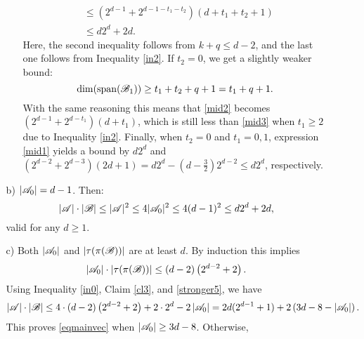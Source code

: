 \begin{enumerate}
\begin{enumerate}
\begin{enumerate}
\begin{align}
                    & \leq \left(2^{d-1} + 2^{d-1-t_1-t_2}\right)\left(d+t_1+t_2+1\right) \nonumber \\
                    & \leq d2^d + 2d. \label{mid3}             
                \end{align}
          Here, the second inequality follows from $k+q\leq d-2$, and the last one follows from Inequality \ref{in2}. If $t_2=0$, we get a slightly weaker bound:
                \begin{equation*}
                    \operatorname{dim}(\operatorname{span}({\mathscr{B}}_1)) \geq t_1+t_2+q+1 =t_1+q+1. \end{equation*}
                With the same reasoning this means that \eqref{mid2} becomes $\left(2^{d-1} + 2^{d-t_1}\right)\left(d+t_1\right)$, which is still less than \eqref{mid3} when $t_1\geq2$ due to Inequality \ref{in2}. Finally, when $t_2=0$ and $t_1=0, 1$, expression \eqref{mid1} yields a bound by $d2^d$ and $(2^{d-2}+2^{d-3})(2d+1)=d 2^d - \left(d-\frac{3}{2}\right)2^{d-2}\leq d2^d$, respectively.
            \end{enumerate}
            \item[b)] $|{\mathscr{A}}_0|=d-1$. Then:
            \begin{equation*}
                |{\mathscr{A}}|\cdot|{\mathscr{B}}|\leq|{\mathscr{A}}|^2\leq4|{\mathscr{A}}_0|^2\leq4(d-1)^2\leq d2^d+2d, 
            \end{equation*}
            valid for any $d\ge 1.$
            \item[c)] Both $|{\mathscr{A}}_0|$ and $|\tau(\pi({\mathscr{B}}))|$ are at least $d$. By induction this implies 
            \[
            \left|{\mathscr{A}}_0\right|\cdot\left|\tau(\pi({\mathscr{B}}))\right|\leq\left(d-2\right)\left(2^{d-2}+2\right).
            \]
            Using Inequality \ref{in0}, Claim \ref{cl3}, and \eqref{stronger5}, we have 
            \begin{equation*}
                \left|{\mathscr{A}}\right|\cdot\left|{\mathscr{B}}\right| \leq 4\cdot\left(d-2\right)\left(2^{d-2}+2\right)+2 \cdot 2^d - 2\left|{\mathscr{A}}_0\right| = 2d(2^{d-1}+1)+2\left(3d-8-\left|{\mathscr{A}}_0\right|\right).
            \end{equation*}
            This proves \eqref{eqmainvec} when $\left|{\mathscr{A}}_0\right|\geq3d-8$. Otherwise,

\end{enumerate}
\end{enumerate}
